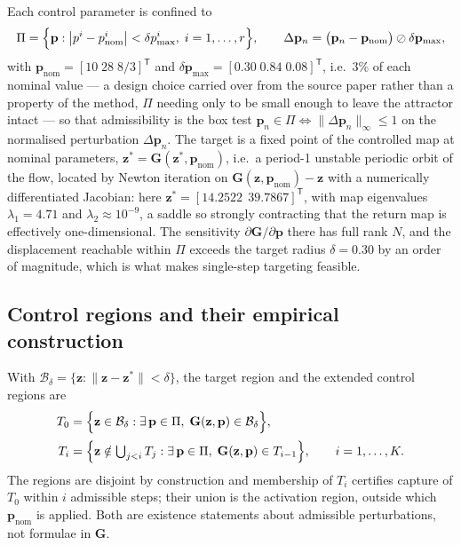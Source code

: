Each control parameter is confined to
%
\begin{equation}
\Pi=\Bigl\{\mathbf{p}:\bigl|p^{i}-p^{i}_{\mathrm{nom}}\bigr|<\delta p^{i}_{\max},\;i=1,\dots,r\Bigr\},
\qquad
\Delta\mathbf{p}_n=\bigl(\mathbf{p}_n-\mathbf{p}_{\mathrm{nom}}\bigr)\oslash\delta\mathbf{p}_{\max},
\label{eq:admissible-set}
\end{equation}
%
with $\mathbf{p}_{\mathrm{nom}}=[10\;28\;8/3]^{\mathsf T}$ and
$\delta\mathbf{p}_{\max}=[0.30\;0.84\;0.08]^{\mathsf T}$, i.e.\ $3\%$ of each
nominal value --- a design choice carried over from the source paper rather
than a property of the method, $\Pi$ needing only to be small enough to leave
the attractor intact --- so that admissibility is the box test
$\mathbf{p}_n\in\Pi\iff\|\Delta\mathbf{p}_n\|_{\infty}\le1$ on the normalised
perturbation $\Delta\mathbf{p}_n$. The target is a fixed point of the controlled
map at nominal parameters,
$\mathbf{z}^{*}=\mathbf{G}(\mathbf{z}^{*},\mathbf{p}_{\mathrm{nom}})$, i.e.\ a
period-1 unstable periodic orbit of the flow, located by Newton
iteration on $\mathbf{G}(\mathbf{z},\mathbf{p}_{\mathrm{nom}})-\mathbf{z}$ with a
numerically differentiated Jacobian: here
$\mathbf{z}^{*}=[14.2522\;\,39.7867]^{\mathsf T}$, with map eigenvalues
$\lambda_1=4.71$ and $\lambda_2\approx10^{-9}$, a saddle so strongly contracting
that the return map is effectively one-dimensional. The sensitivity
$\partial\mathbf{G}/\partial\mathbf{p}$ there has full rank $N$, and the
displacement reachable within $\Pi$ exceeds the target radius $\delta=0.30$ by
an order of magnitude, which is what makes single-step targeting feasible.

\subsection{Control regions and their empirical construction}
\label{subsec:ecr-regions}

With $\mathcal{B}_\delta=\{\mathbf{z}:\|\mathbf{z}-\mathbf{z}^{*}\|<\delta\}$,
the target region and the extended control regions are
%
\begin{align}
T_0&=\Bigl\{\mathbf{z}\in\mathcal{B}_\delta:\exists\,\mathbf{p}\in\Pi,\;
\mathbf{G}(\mathbf{z},\mathbf{p})\in\mathcal{B}_\delta\Bigr\},
\label{eq:def-T0}\\[2pt]
T_i&=\Bigl\{\mathbf{z}\notin\textstyle\bigcup_{j<i}T_j:\exists\,\mathbf{p}\in\Pi,\;
\mathbf{G}(\mathbf{z},\mathbf{p})\in T_{i-1}\Bigr\},
\qquad i=1,\dots,K .
\label{eq:def-Ti}
\end{align}
%
The regions are disjoint by construction and membership of $T_i$ certifies
capture of $T_0$ within $i$ admissible steps; their union is the activation
region, outside which $\mathbf{p}_{\mathrm{nom}}$ is applied. Both are existence
statements about admissible perturbations, not formulae in $\mathbf{G}$.

